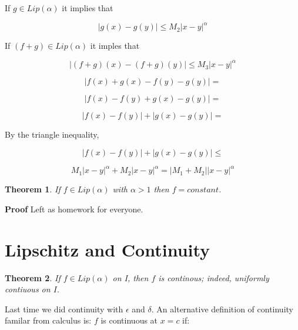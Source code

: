 \documentclass{article}
\newtheorem{thm}{Theorem}
\begin{document}
If $g \in Lip (\alpha)$ it implies that

\begin{displaymath}
|g(x) - g(y)| \leq M_2 |x - y|^\alpha
\end{displaymath}

If $(f + g) \in Lip (\alpha)$ it imples that

\begin{displaymath}
|(f + g)(x) - (f + g)(y)| \leq M_3 |x - y|^\alpha
\end{displaymath}

\begin{displaymath}
|f(x) + g(x) - f(y) - g(y)| =
\end{displaymath}

\begin{displaymath}
|f(x) - f(y) + g(x) - g(y)| =
\end{displaymath}

\begin{displaymath}
|f(x)  - f(y)| + |g(x) - g(y)| =
\end{displaymath}

By the triangle inequality,

\begin{displaymath}
|f(x) - f(y)| + |g(x) - g(y)| \leq
\end{displaymath}

\begin{displaymath}
M_1 |x - y|^\alpha + M_2 |x - y|^\alpha = |M_1 + M_2| |x - y|^\alpha
\end{displaymath}




\begin{thm}
If $f \in Lip (\alpha)$ with $\alpha > 1$ then 
$f = constant$.  
\end{thm}

\textbf{Proof}
Left as homework for everyone.

\section{Lipschitz and Continuity}

\begin{thm}
If $f \in Lip (\alpha)$ on I, then $f$ is continous; 
indeed, uniformly contiuous on $I$. 
\end{thm}

Last time we did continuity with $\epsilon$ and $\delta$. An alternative
definition of continuity familar from calculus is: $f$ is continuous at
$x = c$ if:
\end{document}
